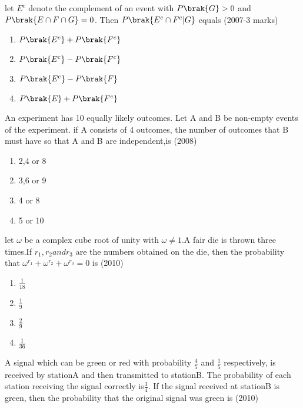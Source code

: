 \item let $E^{c}$ denote the complement of an event with $P\brak{G}>0$ and $P\brak{E\cap F\cap G}=0$. Then $P\brak{E^{c}\cap F^{c}|G}$ equals \hfill (2007-3 marks)
\begin{multicols}{2}
\begin{enumerate}
    \item $P\brak{E^{c}}+P\brak{F^{c}}$
    \item $P\brak{E^{c}}-P\brak{F^{c}}$
    \item $P\brak{E^{c}}-P\brak{F}$
    \item $P\brak{E}+P\brak{F^{c}}$    
\end{enumerate}
\end{multicols}
\item An experiment has 10 equally likely outcomes. Let A and B be non-empty events of the experiment. if A consists of 4 outcomes, the number of outcomes that B must have so that A and B are independent,is \hfill (2008)
\begin{multicols}{2}
\begin{enumerate}
    \item 2,4 or 8
    \item 3,6 or 9
    \item 4 or 8
    \item 5 or 10
\end{enumerate}
    
\end{multicols}
\item let $\omega$ be a complex cube root of unity with $\omega\neq 1$.A fair die is thrown three times.If $r_{1},r_{2}and r_{3}$ are the numbers obtained on the die, then the probability that $\omega^{r_{1}}+\omega^{r_{2}}+\omega^{r_{3}}=0$ is \hfill (2010)
\begin{multicols}{4}
\begin{enumerate}
    \item $\frac{1}{18}$
    \item $\frac{1}{9}$
    \item $\frac{2}{9}$
    \item $\frac{1}{36}$
\end{enumerate}
\end{multicols}
\item A signal which can be green or red with probability $\frac{4}{5}$ and $\frac{1}{5}$ respectively, is received by stationA and then transmitted to stationB. The probability of each station receiving the signal correctly is$\frac{3}{4}$. If the signal received at stationB is green, then the probability that the original signal was green is \hfill (2010)
